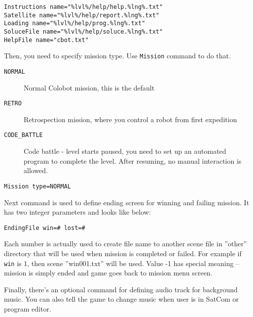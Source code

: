 \begin{lstlisting}[style=scene]
Instructions name="%lvl%/help/help.%lng%.txt"
Satellite name="%lvl%/help/report.%lng%.txt"
Loading name="%lvl%/help/prog.%lng%.txt"
SoluceFile name="%lvl%/help/soluce.%lng%.txt"
HelpFile name="cbot.txt"
\end{lstlisting}

Then, you need to specify mission type. Use \texttt{Mission} command to do that.

\begin{description}
    \item[\texttt{NORMAL}] Normal Colobot mission, this is the default
    \item[\texttt{RETRO}] Retrospection mission, where you control a robot from first expedition 
    \item[\texttt{CODE\_BATTLE}] Code battle - level starts paused, you need to set up an automated program to complete the level. After resuming, no manual interaction is allowed. 
\end{description}


\begin{lstlisting}[style=scene]
Mission type=NORMAL
\end{lstlisting}

Next command is used to define ending screen for winning and failing mission. It has two integer parameters and looks like below:

\begin{lstlisting}[style=scene]
EndingFile win=# lost=#
\end{lstlisting}

Each number is actually used to create file name to another scene file in ''other'' directory that will be used when mission is completed or failed. For example if \texttt{win} is 1, then scene ''win001.txt'' will be used. Value -1 has special meaning -- mission is simply ended and game goes back to mission menu screen.


Finally, there's an optional command for defining audio track for background music. You can also tell the game to change music when user is in SatCom or program editor.

